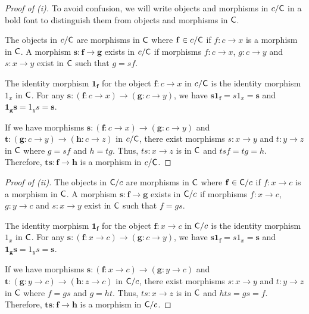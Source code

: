 
\begin{proof}[Proof of (i)]
To avoid confusion, we will write objects and morphisms in $c/\mathsf{C}$ in a bold font to distinguish them from objects and morphisms in $\mathsf{C}$.

The objects in $c/\mathsf{C}$ are morphisms in $\mathsf{C}$ where $\mathbf{f} \in c/\mathsf{C}$ if $f : c \rightarrow x$ is a morphism in $\mathsf{C}$.
A morphism $\mathbf{s}: \mathbf{f} \rightarrow \mathbf{g}$ exists in $c/\mathsf{C}$
if morphisms $f: c \rightarrow x$, $g:c \rightarrow y$ and $s:x \rightarrow y$ exist in $\mathsf{C}$ such that $g = sf$.

The identity morphism $\mathbf{1_f}$ for the object $\mathbf{f}: c \rightarrow x$ in $c/\mathsf{C}$ is the identity morphism $1_x$ in $\mathsf{C}$.
For any $\mathbf{s}: (\mathbf{f}: c \rightarrow x) \rightarrow (\mathbf{g}:c \rightarrow y)$, we have
$\mathbf{s}\mathbf{1_f} = s 1_x = \mathbf{s}$ and $\mathbf{1_g}\mathbf{s} = 1_y s = \mathbf{s}$.

If we have morphisms $\mathbf{s} : (\mathbf{f}: c \rightarrow x) \rightarrow (\mathbf{g}:c \rightarrow y)$ and
$\mathbf{t} : (\mathbf{g}: c \rightarrow y) \rightarrow (\mathbf{h}:c \rightarrow z)$ in $c/\mathsf{C}$, there exist morphisms
$s : x \rightarrow y$ and $t : y \rightarrow z$ in $\mathsf{C}$ where $g = sf$ and $h = tg$.
Thus, $ts: x \rightarrow z$ is in $\mathsf{C}$ and $tsf = tg = h$.
Therefore, $\mathbf{ts}: \mathbf{f} \rightarrow \mathbf{h}$ is a morphism in $c/\mathsf{C}$.
\end{proof}

\begin{proof}[Proof of (ii)]
The objects in $\mathsf{C}/c$ are morphisms in $\mathsf{C}$ where $\mathbf{f} \in \mathsf{C}/c$ if $f : x \rightarrow c$ is a morphism in $\mathsf{C}$.
A morphism $\mathbf{s}: \mathbf{f} \rightarrow \mathbf{g}$ exists in $\mathsf{C}/c$
if morphisms $f: x \rightarrow c$, $g:y \rightarrow c$ and $s:x \rightarrow y$ exist in $\mathsf{C}$ such that $f = gs$.

The identity morphism $\mathbf{1_f}$ for the object $\mathbf{f}: x \rightarrow c$ in $\mathsf{C}/c$ is the identity morphism $1_x$ in $\mathsf{C}$.
For any $\mathbf{s}: (\mathbf{f}: x \rightarrow c) \rightarrow (\mathbf{g}:c \rightarrow y)$, we have
$\mathbf{s}\mathbf{1_f} = s 1_x = \mathbf{s}$ and $\mathbf{1_g}\mathbf{s} = 1_y s = \mathbf{s}$.

If we have morphisms $\mathbf{s} : (\mathbf{f}: x \rightarrow c) \rightarrow (\mathbf{g}:y \rightarrow c)$ and
$\mathbf{t} : (\mathbf{g}: y \rightarrow c) \rightarrow (\mathbf{h}:z \rightarrow c)$ in $\mathsf{C}/c$, there exist morphisms
$s : x \rightarrow y$ and $t : y \rightarrow z$ in $\mathsf{C}$ where $f = gs$ and $g = ht$.
Thus, $ts: x \rightarrow z$ is in $\mathsf{C}$ and $hts = gs = f$.
Therefore, $\mathbf{ts}: \mathbf{f} \rightarrow \mathbf{h}$ is a morphism in $\mathsf{C}/c$.
\end{proof}